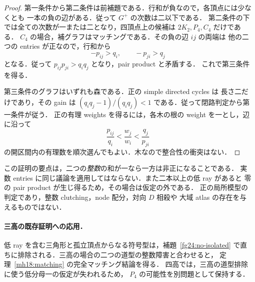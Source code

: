 \begin{proof}
第一条件から第二条件は前補題である．行和が負なので，各頂点には少なくとも
一本の負の辺がある．従って $G^+$ の次数は二以下である．
第二条件の下では全ての次数が一または二となり，四頂点上の候補は
$2K_2,P_4,C_4$ だけである．
$C_4$ の場合，補グラフはマッチングである．その負の辺 $ij$ の両端は
他の二つの entries が正なので，行和から
\[
 -p_{ij}>q_i,\qquad -p_{ji}>q_j
\]
となる．従って $p_{ij}p_{ji}>q_iq_j$ となり，pair product と矛盾する．
これで第三条件を得る．

第三条件のグラフはいずれも森である．正の simple directed cycles は
長さ二だけであり，その gain は
$(q_iq_j-1)/(q_iq_j)<1$ である．従って閉路判定から第一条件が従う．
正の有理 weights を得るには，各木の根の weight を一とし，辺に沿って
\[
 \frac{p_{ij}}{q_i}<\frac{w_j}{w_i}<\frac{q_j}{p_{ji}}
\]
の開区間内の有理数を順次選んでもよい．木なので整合性の衝突はない．
\end{proof}

\begin{remark}[整数性と適用範囲]
この証明の要点は，二つの\emph{整数}の和が一なら一方は非正になることである．
実数 entries に同じ議論を適用してはならない．また二本以上の低 ray があると
零の pair product が生じ得るため，その場合は仮定の外である．
正の局所模型の判定であり，整数 clutching，node 配分，対向 $D$ 相殺や
大域 atlas の存在を与えるものではない．
\end{remark}

\paragraph{三高の既存証明への応用．}
低 ray を含む三角形と孤立頂点からなる符号型は，補題~\ref{fg24:no-isolated}
で直ちに排除される．三高の場合の二つの道型の整数障害と合わせると，
定理~\ref{mh18:matching} の完全マッチング結論を得る．
四高では，三高の道型排除に使う低分母一の仮定が失われるため，
$P_4$ の可能性を別問題として保持する．
